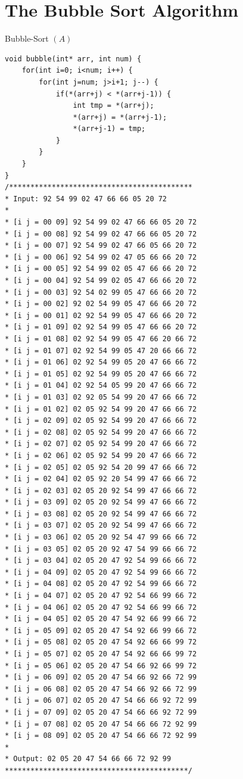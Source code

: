 \documentclass[12pt,openany]{book}
\theoremstyle{definition}
\begin{document}
	\section{The Bubble Sort Algorithm}
	\begin{algorithm}[H]
		\caption{Bubble-Sort $(A)$}
		\BlankLine
		\BlankLine
	\end{algorithm}
	
	\begin{lstlisting}[style=C]
void bubble(int* arr, int num) {
	for(int i=0; i<num; i++) {
		for(int j=num; j>i+1; j--) {
			if(*(arr+j) < *(arr+j-1)) {
				int tmp = *(arr+j);
				*(arr+j) = *(arr+j-1);
				*(arr+j-1) = tmp;
			}
		}
	}
}
/*******************************************
* Input: 92 54 99 02 47 66 66 05 20 72 
* 
* [i j = 00 09] 92 54 99 02 47 66 66 05 20 72 
* [i j = 00 08] 92 54 99 02 47 66 66 05 20 72 
* [i j = 00 07] 92 54 99 02 47 66 05 66 20 72 
* [i j = 00 06] 92 54 99 02 47 05 66 66 20 72 
* [i j = 00 05] 92 54 99 02 05 47 66 66 20 72 
* [i j = 00 04] 92 54 99 02 05 47 66 66 20 72 
* [i j = 00 03] 92 54 02 99 05 47 66 66 20 72 
* [i j = 00 02] 92 02 54 99 05 47 66 66 20 72 
* [i j = 00 01] 02 92 54 99 05 47 66 66 20 72 
* [i j = 01 09] 02 92 54 99 05 47 66 66 20 72 
* [i j = 01 08] 02 92 54 99 05 47 66 20 66 72 
* [i j = 01 07] 02 92 54 99 05 47 20 66 66 72 
* [i j = 01 06] 02 92 54 99 05 20 47 66 66 72 
* [i j = 01 05] 02 92 54 99 05 20 47 66 66 72 
* [i j = 01 04] 02 92 54 05 99 20 47 66 66 72 
* [i j = 01 03] 02 92 05 54 99 20 47 66 66 72 
* [i j = 01 02] 02 05 92 54 99 20 47 66 66 72 
* [i j = 02 09] 02 05 92 54 99 20 47 66 66 72 
* [i j = 02 08] 02 05 92 54 99 20 47 66 66 72 
* [i j = 02 07] 02 05 92 54 99 20 47 66 66 72 
* [i j = 02 06] 02 05 92 54 99 20 47 66 66 72 
* [i j = 02 05] 02 05 92 54 20 99 47 66 66 72 
* [i j = 02 04] 02 05 92 20 54 99 47 66 66 72 
* [i j = 02 03] 02 05 20 92 54 99 47 66 66 72 
* [i j = 03 09] 02 05 20 92 54 99 47 66 66 72 
* [i j = 03 08] 02 05 20 92 54 99 47 66 66 72 
* [i j = 03 07] 02 05 20 92 54 99 47 66 66 72 
* [i j = 03 06] 02 05 20 92 54 47 99 66 66 72 
* [i j = 03 05] 02 05 20 92 47 54 99 66 66 72 
* [i j = 03 04] 02 05 20 47 92 54 99 66 66 72 
* [i j = 04 09] 02 05 20 47 92 54 99 66 66 72 
* [i j = 04 08] 02 05 20 47 92 54 99 66 66 72 
* [i j = 04 07] 02 05 20 47 92 54 66 99 66 72 
* [i j = 04 06] 02 05 20 47 92 54 66 99 66 72 
* [i j = 04 05] 02 05 20 47 54 92 66 99 66 72 
* [i j = 05 09] 02 05 20 47 54 92 66 99 66 72 
* [i j = 05 08] 02 05 20 47 54 92 66 66 99 72 
* [i j = 05 07] 02 05 20 47 54 92 66 66 99 72 
* [i j = 05 06] 02 05 20 47 54 66 92 66 99 72 
* [i j = 06 09] 02 05 20 47 54 66 92 66 72 99 
* [i j = 06 08] 02 05 20 47 54 66 92 66 72 99 
* [i j = 06 07] 02 05 20 47 54 66 66 92 72 99 
* [i j = 07 09] 02 05 20 47 54 66 66 92 72 99 
* [i j = 07 08] 02 05 20 47 54 66 66 72 92 99 
* [i j = 08 09] 02 05 20 47 54 66 66 72 92 99 
* 
* Output: 02 05 20 47 54 66 66 72 92 99 
*******************************************/
	\end{lstlisting}
	
\end{document}
